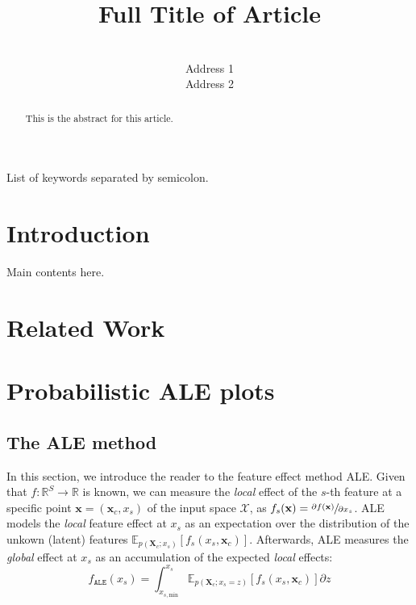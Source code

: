 \documentclass[wcp]{jmlr}
\title[Short Title]{Full Title of Article}
\author{\Name{Author Name1} \Email{abc@sample.com}\\
  \addr Address 1
  \AND
  \Name{Author Name2} \Email{xyz@sample.com}\\
  \addr Address 2
 }
\newcommand{\xc}{\mathbf{x}_c}
\newcommand{\Xc}{\mathbf{X}_c}
\newcommand{\x}{\mathbf{x}}
\newcommand{\E}{\mathbb{E}}
\newcommand{\R}{\mathbb{R}}
\newcommand{\1}{\mathbbm{1}}
\begin{document}
\maketitle

\begin{abstract}
This is the abstract for this article.
\end{abstract}
\begin{keywords}
List of keywords separated by semicolon.
\end{keywords}

\section{Introduction}
Main contents here.

\section{Related Work}



\section{Probabilistic ALE plots}

\subsection{The ALE method}\label{sec:ALE}

In this section, we introduce the reader to the feature effect method
ALE. Given that \(f: \R^S \rightarrow \R \) is known, we can measure
the \textit{local} effect of the \(s\)-th feature at a specific point
\( \x = (\xc, x_s)\) of the input space \(\mathcal{X}\), as
\(f_s(\x) = \sfrac{\partial f(\x)}{\partial x_s}\). ALE models the
\textit{local} feature effect at \(x_s\) as an expectation over the
distribution of the unkown (latent) features
\(\E_{p(\Xc;x_s)}[f_s(x_s, \xc)]\). Afterwards, ALE measures the
\textit{global} effect at \(x_s\) as an accumulation of the expected
\textit{local} effects:
%
\begin{equation}
  \label{eq:ale-definition}
  f_{\mathtt{ALE}}(x_s) =
  \int_{x_{s, \text{min}}}^{x_s} \E_{p(\Xc;x_s=z)}[f_s(x_s, \xc)] \partial z
\end{equation}
\end{document}
